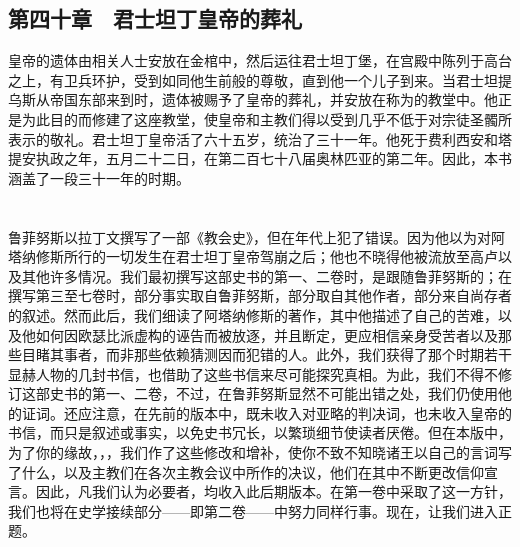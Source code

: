 
\subsection{第四十章　君士坦丁皇帝的葬礼}

皇帝的遗体由相关人士安放在金棺中，然后运往君士坦丁堡，在宫殿中陈列于高台之上，有卫兵环护，受到如同他生前般的尊敬，直到他一个儿子到来。当君士坦提乌斯从帝国东部来到时，遗体被赐予了皇帝的葬礼，并安放在称为的教堂中。他正是为此目的而修建了这座教堂，使皇帝和主教们得以受到几乎不低于对宗徒圣髑所表示的敬礼。君士坦丁皇帝活了六十五岁，统治了三十一年。他死于费利西安和塔提安执政之年，五月二十二日，在第二百七十八届奥林匹亚的第二年。因此，本书涵盖了一段三十一年的时期。\par



\section{}


\subsection{}

鲁菲努斯以拉丁文撰写了一部《教会史》，但在年代上犯了错误。因为他以为对阿塔纳修斯所行的一切发生在君士坦丁皇帝驾崩之后；他也不晓得他被流放至高卢以及其他许多情况。我们最初撰写这部史书的第一、二卷时，是跟随鲁菲努斯的；在撰写第三至七卷时，部分事实取自鲁菲努斯，部分取自其他作者，部分来自尚存者的叙述。然而此后，我们细读了阿塔纳修斯的著作，其中他描述了自己的苦难，以及他如何因欧瑟比派虚构的诬告而被放逐，并且断定，更应相信亲身受苦者以及那些目睹其事者，而非那些依赖猜测因而犯错的人。此外，我们获得了那个时期若干显赫人物的几封书信，也借助了这些书信来尽可能探究真相。为此，我们不得不修订这部史书的第一、二卷，不过，在鲁菲努斯显然不可能出错之处，我们仍使用他的证词。还应注意，在先前的版本中，既未收入对亚略的判决词，也未收入皇帝的书信，而只是叙述或事实，以免史书冗长，以繁琐细节使读者厌倦。但在本版中，为了你的缘故，，，我们作了这些修改和增补，使你不致不知晓诸王以自己的言词写了什么，以及主教们在各次主教会议中所作的决议，他们在其中不断更改信仰宣言。因此，凡我们认为必要者，均收入此后期版本。在第一卷中采取了这一方针，我们也将在史学接续部分——即第二卷——中努力同样行事。现在，让我们进入正题。\par

